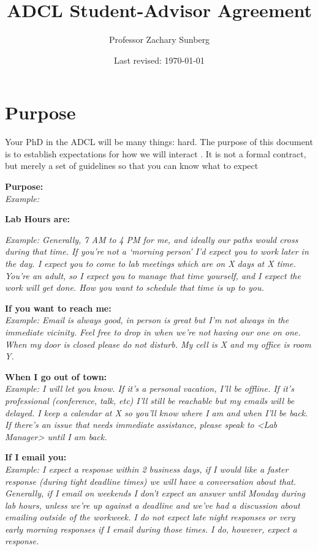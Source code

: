 \documentclass[]{article}
\title{ADCL Student-Advisor Agreement}
\author{Professor Zachary Sunberg}
\date{Last revised: \today}
\begin{document}
\maketitle

\section{Purpose}

Your PhD in the ADCL will be many things: hard. The purpose of this document is to establish expectations for how we will interact . It is not a formal contract, but merely a set of guidelines so that you can know what to expect

\textbf{{Purpose:\\
}}\emph{Example:}

\textbf{{Lab Hours are:}}

\emph{Example: Generally, 7 AM to 4 PM for me, and ideally our paths
would cross during that time. If you're not a `morning person' I'd
expect you to work later in the day. I expect you to come to lab
meetings which are on X days at X time. You're an adult, so I expect you
to manage that time yourself, and I expect the work will get done. How
you want to schedule that time is up to you.}

\textbf{{If you want to reach me:}\\
}\emph{Example: Email is always good, in person is great but I'm not
always in the immediate vicinity. Feel free to drop in when we're not
having our one on one. When my door is closed please do not disturb. My
cell is X and my office is room Y.}

\textbf{{When I go out of town:\\
}}\emph{Example: I will let you know. If it's a personal vacation, I'll
be offline. If it's professional (conference, talk, etc) I'll still be
reachable but my emails will be delayed. I keep a calendar at X so
you'll know where I am and when I'll be back. If there's an issue that
needs immediate assistance, please speak to \textless{}Lab
Manager\textgreater{} until I am back.}

\textbf{{If I email you:}\\
}\emph{Example: I expect a response within 2 business days, if I would
like a faster response (during tight deadline times) we will have a
conversation about that. Generally, if I email on weekends I don't
expect an answer until Monday during lab hours, unless we're up against
a deadline and we've had a discussion about emailing outside of the
workweek. I do not expect late night responses or very early morning
responses if I email during those times. I do, however, expect a
response.}
\end{document}
